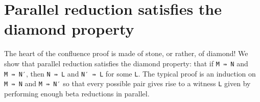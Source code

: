 \begin{fence}
\begin{code}%
\>[0]\AgdaSpace{}%
\AgdaSymbol{:}\AgdaSpace{}%
\AgdaSpace{}%
\AgdaSpace{}%
\AgdaSymbol{\}}\AgdaSpace{}%
\AgdaSymbol{\{}\AgdaSpace{}%
\AgdaSpace{}%
\AgdaSymbol{:}\AgdaSpace{}%
\AgdaSpace{}%
\AgdaOperator{\AgdaInductiveConstructor{,}}\AgdaSpace{}%
\AgdaSpace{}%
\AgdaSpace{}%
\AgdaSymbol{\}}\AgdaSpace{}%
\AgdaSymbol{\{}\AgdaSpace{}%
\AgdaSpace{}%
\AgdaSymbol{:}\AgdaSpace{}%
\AgdaSpace{}%
\AgdaSpace{}%
\AgdaSymbol{\}}\<%
\\
\>[0][@{}l@{\AgdaIndent{0}}]%
\>[2]\AgdaSpace{}%
\AgdaSpace{}%
\AgdaSpace{}%
\<%
\\
%
\>[2]%
\>[881I]\AgdaSpace{}%
\AgdaSpace{}%
\<%
\\
\>[.][@{}l@{}]\<[881I]%
\>[4]\AgdaComment{--------------------------}\<%
\\
%
\>[2]\AgdaSpace{}%
\AgdaSpace{}%
\AgdaOperator{\AgdaFunction{[}}\AgdaSpace{}%
\AgdaSpace{}%
\AgdaOperator{\AgdaFunction{]}}\AgdaSpace{}%
\AgdaSpace{}%
\AgdaSpace{}%
\AgdaOperator{\AgdaFunction{[}}\AgdaSpace{}%
\AgdaSpace{}%
\AgdaOperator{\AgdaFunction{]}}\<%
\\
\>[0]\AgdaSpace{}%
\AgdaSpace{}%
\AgdaSpace{}%
\AgdaSymbol{=}\AgdaSpace{}%
\AgdaSpace{}%
\AgdaSymbol{(}\AgdaSpace{}%
\AgdaSymbol{)}\AgdaSpace{}%
\<%
\end{code}
\end{fence}

\hypertarget{parallel-reduction-satisfies-the-diamond-property}{%
\section{Parallel reduction satisfies the diamond
property}\label{parallel-reduction-satisfies-the-diamond-property}}

The heart of the confluence proof is made of stone, or rather, of
diamond! We show that parallel reduction satisfies the diamond property:
that if \texttt{M\ ⇛\ N} and \texttt{M\ ⇛\ N′}, then \texttt{N\ ⇛\ L}
and \texttt{N′\ ⇛\ L} for some \texttt{L}. The typical proof is an
induction on \texttt{M\ ⇛\ N} and \texttt{M\ ⇛\ N′} so that every
possible pair gives rise to a witness \texttt{L} given by performing
enough beta reductions in parallel.

